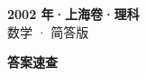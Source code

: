 \documentclass[zihao=-4, a4paper]{ctexart}
\begin{document}
\begin{center}
  {\Large\bfseries 2002 年·上海卷·理科}\\[4pt]
  {\large 数学 · 简答版}
\end{center}
\medskip
{}

\clearpage
{}
\begin{center}{\Large\bfseries 答案速查}\end{center}
\medskip

\end{document}
